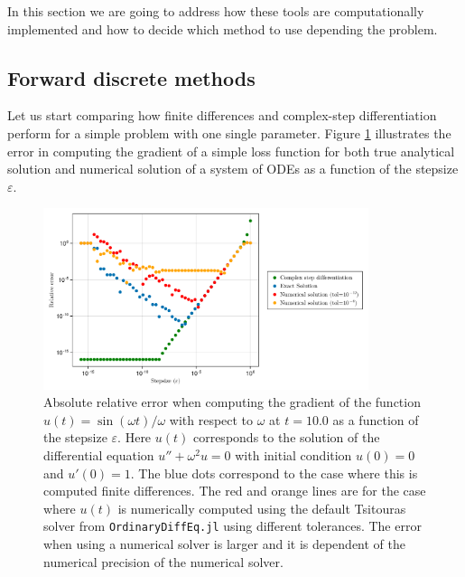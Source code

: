 
In this section we are going to address how these tools are computationally implemented and how to decide which method to use depending the problem. 

\subsection{Forward discrete methods}

Let us start comparing how finite differences and complex-step differentiation perform for a simple problem with one single parameter. 
Figure \ref{fig:finite-diff} illustrates the error in computing the gradient of a simple loss function for both true analytical solution and numerical solution of a system of ODEs as a function of the stepsize $\varepsilon$.

\begin{figure}[tbh]
    \centering
    \includegraphics[width=0.85\textwidth]{../code/finite_differences/finite_difference_derivative.pdf}
    \caption{Absolute relative error when computing the gradient of the function $u(t) = \sin (\omega t)/\omega$ with respect to $\omega$ at $t=10.0$ as a function of the stepsize $\varepsilon$. Here $u(t)$ corresponds to the solution of the differential equation $u'' + \omega^2 u = 0$ with initial condition $u(0)=0$ and $u'(0)=1$. The blue dots correspond to the case where this is computed finite differences. The red and orange lines are for the case where $u(t)$ is numerically computed using the default Tsitouras solver \cite{Tsitouras_2011} from \texttt{OrdinaryDiffEq.jl} using different tolerances. The error when using  a numerical solver is larger and it is dependent of the numerical precision of the numerical solver. }
    \label{fig:finite-diff}
\end{figure}

